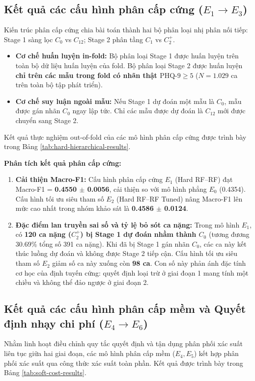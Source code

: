 \subsection{Kết quả các cấu hình phân cấp cứng ($E_1 \to E_3$)}
Kiến trúc phân cấp cứng chia bài toán thành hai bộ phân loại nhị phân nối tiếp: Stage 1 sàng lọc $C_0$ vs $C_{12}$; Stage 2 phân tầng $C_1$ vs $C_2^+$.
\begin{itemize}
    \item \textbf{Cơ chế huấn luyện in-fold:} Bộ phân loại Stage 1 được huấn luyện trên toàn bộ dữ liệu huấn luyện của fold. Bộ phân loại Stage 2 được huấn luyện \textbf{chỉ trên các mẫu trong fold có nhãn thật $\text{PHQ-9} \ge 5$} ($N = 1.029$ ca trên toàn bộ tập phát triển).
    \item \textbf{Cơ chế suy luận ngoài mẫu:} Nếu Stage 1 dự đoán một mẫu là $C_0$, mẫu được gán nhãn $C_0$ ngay lập tức. Chỉ các mẫu được dự đoán là $C_{12}$ mới được chuyển sang Stage 2.
\end{itemize}

Kết quả thực nghiệm out-of-fold của các mô hình phân cấp cứng được trình bày trong Bảng \ref{tab:hard-hierarchical-results}.



\textbf{Phân tích kết quả phân cấp cứng:}
\begin{enumerate}
    \item \textbf{Cải thiện Macro-F1:} Cấu hình phân cấp cứng $E_1$ (Hard RF--RF) đạt Macro-F1 = \textbf{0.4550 $\pm$ 0.0056}, cải thiện so với mô hình phẳng $E_0$ (0.4354). Cấu hình tối ưu siêu tham số $E_2$ (Hard RF--RF Tuned) nâng Macro-F1 lên mức cao nhất trong nhóm khảo sát là \textbf{0.4586 $\pm$ 0.0124}.
    \item \textbf{Đặc điểm lan truyền sai số và tỷ lệ bỏ sót ca nặng:} Trong mô hình $E_1$, có \textbf{120 ca nặng ($C_2^+$) bị Stage 1 dự đoán nhầm thành $C_0$} (tương đương 30.69\% tổng số 391 ca nặng). Khi đã bị Stage 1 gán nhãn $C_0$, các ca này kết thúc luồng dự đoán và không được Stage 2 tiếp cận. Cấu hình tối ưu siêu tham số $E_2$ giảm số ca này xuống còn \textbf{98 ca}. Con số này phản ánh đặc tính cơ học của định tuyến cứng: quyết định loại trừ ở giai đoạn 1 mang tính một chiều và không thể đảo ngược ở giai đoạn 2.
\end{enumerate}

\subsection{Kết quả các cấu hình phân cấp mềm và Quyết định nhạy chi phí ($E_4 \to E_6$)}
Nhằm linh hoạt điều chỉnh quy tắc quyết định và tận dụng phân phối xác suất liên tục giữa hai giai đoạn, các mô hình phân cấp mềm ($E_4, E_5$) kết hợp phân phối xác suất qua công thức xác suất toàn phần. Kết quả được trình bày trong Bảng \ref{tab:soft-cost-results}.

